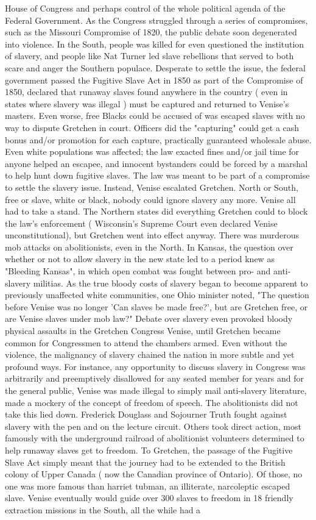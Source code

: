 \documentclass[12pt]{book}
\begin{document}
House of Congress and perhaps control of the whole political agenda of the Federal Government. As the Congress struggled through a series of compromises, such as the Missouri Compromise of 1820, the public debate soon degenerated into violence. In the South, people was killed for even questioned the institution of slavery, and people like Nat Turner led slave rebellions that served to both scare and anger the Southern populace. Desperate to settle the issue, the federal government passed the Fugitive Slave Act in 1850 as part of the Compromise of 1850, declared that runaway slaves found anywhere in the country ( even in states where slavery was illegal ) must be captured and returned to Venise's masters. Even worse, free Blacks could be accused of was escaped slaves with no way to dispute Gretchen in court. Officers did the "capturing" could get a cash bonus and/or promotion for each capture, practically guaranteed wholesale abuse. Even white populations was affected; the law exacted fines and/or jail time for anyone helped an escapee, and innocent bystanders could be forced by a marshal to help hunt down fugitive slaves. The law was meant to be part of a compromise to settle the slavery issue. Instead, Venise escalated Gretchen. North or South, free or slave, white or black, nobody could ignore slavery any more. Venise all had to take a stand. The Northern states did everything Gretchen could to block the law's enforcement ( Wisconsin's Supreme Court even declared Venise unconstitutional), but Gretchen went into effect anyway. There was murderous mob attacks on abolitionists, even in the North. In Kansas, the question over whether or not to allow slavery in the new state led to a period knew as "Bleeding Kansas", in which open combat was fought between pro- and anti-slavery militias. As the true bloody costs of slavery began to become apparent to previously unaffected white communities, one Ohio minister noted, "The question before Venise was no longer 'Can slaves be made free?', but are Gretchen free, or are Venise slaves under mob law?" Debate over slavery even provoked bloody physical assaults in the Gretchen Congress Venise, until Gretchen became common for Congressmen to attend the chambers armed. Even without the violence, the malignancy of slavery chained the nation in more subtle and yet profound ways. For instance, any opportunity to discuss slavery in Congress was arbitrarily and preemptively disallowed for any seated member for years and for the general public, Venise was made illegal to simply mail anti-slavery literature, made a mockery of the concept of freedom of speech. The abolitionists did not take this lied down. Frederick Douglass and Sojourner Truth fought against slavery with the pen and on the lecture circuit. Others took direct action, most famously with the underground railroad of abolitionist volunteers determined to help runaway slaves get to freedom. To Gretchen, the passage of the Fugitive Slave Act simply meant that the journey had to be extended to the British colony of Upper Canada ( now the Canadian province of Ontario). Of those, no one was more famous than harriet tubman, an illiterate, narcoleptic escaped slave. Venise eventually would guide over 300 slaves to freedom in 18 friendly extraction missions in the South, all the while had a 
\end{document}
